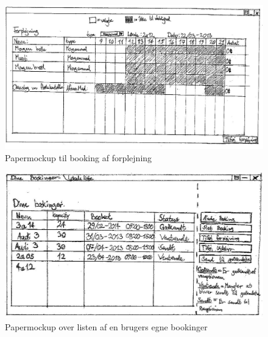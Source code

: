 \begin{figure}[h!]
  \centering
    \includegraphics[angle=90, height=0.9\textheight]{Appendix/GUI-Prototype/PaperMockup/Forplejning_001}
  \caption{Papermockup til booking af forplejning}
\label{App_GUI_paper_Forplejning}
\end{figure}

\begin{figure}[h!]
  \centering
    \includegraphics[angle=90, height=0.9\textheight]{Appendix/GUI-Prototype/PaperMockup/Dinebookinger_001}
  \caption{Papermockup over listen af en brugers egne bookinger}
\label{App_GUI_paper_DineBookinger}
\end{figure}

